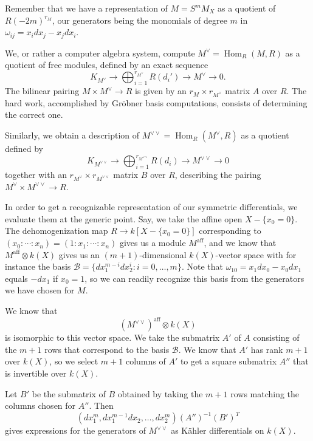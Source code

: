 \documentclass[12pt, reqno]{amsart}
\theoremstyle{definition}
\newcommand{\calB}{{\mathcal B}}
\DeclareMathOperator{\Hom}{Hom}
\numberwithin{equation}{section}
\numberwithin{table}{section}
\begin{document}
Remember that we have a representation of $M=S^m M_X$ as a quotient of $R(-2m)^{r_M}$, our generators being the monomials of degree $m$ in $\omega_{ij}=x_idx_j-x_jdx_i$.

We, or rather a computer algebra system, compute $M^\vee=\Hom_R(M,R)$ as a quotient of free modules, defined by an exact sequence
\[K_{M^\vee}\to\bigoplus_{i=1}^{r_{M^\vee}} R(d_i')\to M^\vee\to 0.\]
The bilinear pairing $M\times M^\vee\to R$ is given by an $r_M\times r_{M^\vee}$ matrix $A$ over $R$. The hard work, accomplished by Gr\"obner basis computations, consists of determining the correct one.

Similarly, we obtain a description of $M^{\vee\vee}=\Hom_R(M^\vee,R)$ as a quotient defined by 
\[K_{M^{\vee\vee}}\to\bigoplus_{i=1}^{r_{M^{\vee\vee}}} R(d_i)\to M^{\vee\vee}\to 0\]
together with an $r_{M^\vee}\times r_{M^{\vee\vee}}$ matrix $B$ over $R$, describing the pairing $M^\vee\times M^{\vee\vee}\to R$.

In order to get a recognizable representation of our symmetric differentials, we evaluate them at the generic point. Say, we take the affine open $X- \{x_0=0\}$. The dehomogenization map $R\to k[X- \{x_0=0\}]$ corresponding to $(x_0:\cdots:x_n)=(1:x_1:\cdots:x_n)$ gives us a module $M^\text{aff}$, and we know that $M^\text{aff}\otimes k(X)$ gives us an $(m+1)$-dimensional $k(X)$-vector space with for instance the basis $\calB=\{dx_1^{m-i}dx_2^i: i =0,\ldots,m\}$. Note that $\omega_{10}=x_1dx_0-x_0dx_1$ equals $-dx_1$ if $x_0=1$, so we can readily recognize this basis from the generators we have chosen for $M$.

We know that $$(M^{\vee\vee})^\text{aff}\otimes k(X)$$ is isomorphic to 
this vector space. We take the submatrix $A'$ of $A$ consisting of the $m+1$ rows that correspond to the basis $\calB$. We know that $A'$ has rank $m+1$ over $k(X)$, so we select $m+1$ columns of $A'$ to get a square submatrix $A''$ that is invertible over $k(X)$.

Let $B'$ be the submatrix of $B$ obtained by taking the $m+1$ rows matching the columns chosen for $A''$. Then 
\[(dx_1^m,dx_1^{m-1}dx_2,\ldots,dx_2^m)(A'')^{-1}(B')^T\]
gives expressions for the generators of $M^{\vee\vee}$ as K\"ahler differentials on $k(X)$.
\end{document}
